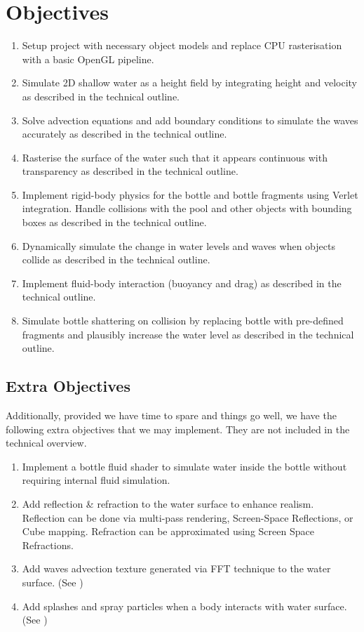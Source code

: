 \section{Objectives}
\begin{enumerate}
     \item Setup project with necessary object models and replace CPU rasterisation with a basic OpenGL pipeline.

     \item Simulate 2D shallow water as a height field by integrating height and velocity as described in the technical outline.

     \item Solve advection equations and add boundary conditions to simulate the waves accurately as described in the technical outline.

     \item Rasterise the surface of the water such that it appears continuous with transparency as described in the technical outline.

     \item Implement rigid-body physics for the bottle and bottle fragments using Verlet integration. Handle collisions with the pool and other objects with bounding boxes as described in the technical outline.
     
     \item Dynamically simulate the change in water levels and waves when objects collide as described in the technical outline.

     \item Implement fluid-body interaction (buoyancy and drag) as described in the technical outline. 

     \item Simulate bottle shattering on collision by replacing bottle with pre-defined fragments and plausibly increase the water level as described in the technical outline.
\end{enumerate}

\subsection{Extra Objectives}
Additionally, provided we have time to spare and things go well, we have the following extra objectives that we may implement.
They are not included in the technical overview.
\begin{enumerate}
\item Implement a bottle fluid shader to simulate water inside the bottle without requiring internal fluid simulation.
\item Add reflection \& refraction to the water surface to enhance realism. Reflection can be done via multi-pass rendering, Screen-Space Reflections, or Cube mapping. Refraction can be approximated using Screen Space Refractions.
\item Add waves advection texture generated via FFT technique to the water surface. (See \cite{hfluid})
\item Add splashes and spray particles when a body interacts with water surface. (See \cite{hfluid})
\end{enumerate}

